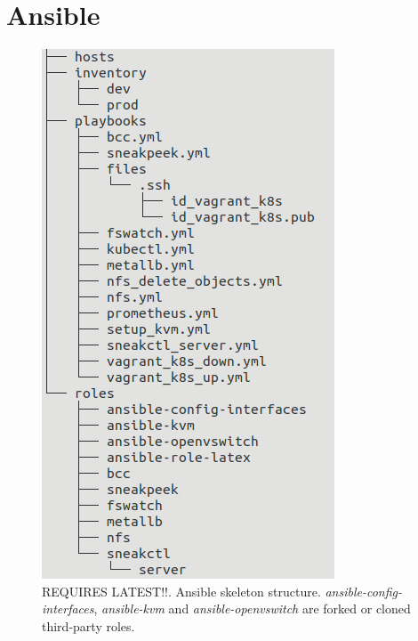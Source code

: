 \setcounter{figure}{0}
\setcounter{listing}{0}
\appendixpagenumbering

\chapter{Ansible \label{appendix:ansible}}

\begin{figure}[h]
	\centering
	\includegraphics[scale=0.5]{assets/appendices/ansible_tree}
	\caption{REQUIRES LATEST!!. Ansible skeleton structure. \textit{ansible-config-interfaces}, \textit{ansible-kvm} and \textit{ansible-openvswitch} are forked or cloned third-party roles.}
	\label{appendix:ansible:structure}
\end{figure}


